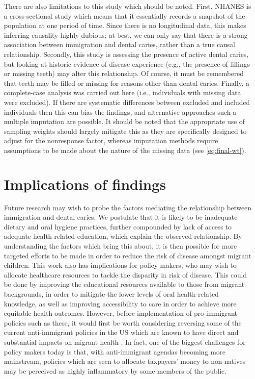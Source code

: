 There are also limitations to this study which should be noted. First, NHANES is a cross-sectional study which means that it essentially records a snapshot of the population at one period of time. Since there is no longitudinal data, this makes inferring causality highly dubious; at best, we can only say that there is a strong association between immigration and dental caries, rather than a true causal relationship. Secondly, this study is assessing the presence of active dental caries, but looking at historic evidence of disease experience (e.g., the presence of fillings or missing teeth) may alter this relationship. Of course, it must be remembered that teeth may be filled or missing for reasons other than dental caries. Finally, a complete-case analysis was carried out here (i.e., individuals with missing data were excluded). If there are systematic differences between excluded and included individuals then this can bias the findings, and alternative approaches such a multiple imputation are possible. It should be noted that the appropriate use of sampling weights should largely mitigate this as they are specifically designed to adjust for the nonresponse factor, whereas imputation methods require assumptions to be made about the nature of the missing data (see \autoref{eq:final-wt}).

\section{Implications of findings}

Future research may wish to probe the factors mediating the relationship between immigration and dental caries. We postulate that it is likely to be inadequate dietary and oral hygiene practices, further compounded by lack of access to adequate health-related education, which explain the observed relationship. By understanding the factors which bring this about, it is then possible for more targeted efforts to be made in order to reduce the risk of disease amongst migrant children. This work also has implications for policy makers, who may wish to allocate healthcare resources to tackle the disparity in risk of disease. This could be done by improving the educational resources available to those from migrant backgrounds, in order to mitigate the lower levels of oral health-related knowledge, as well as improving accessibility to care in order to achieve more equitable health outcomes. However, before implementation of pro-immigrant policies such as these, it would first be worth considering reversing some of the current anti-immigrant policies in the US which are known to have direct and substantial impacts on migrant health \citep{nuño2022}. In fact, one of the biggest challenges for policy makers today is that, with anti-immigrant agendas becoming more mainstream, policies which are seen to allocate taxpayers' money to non-natives may be perceived as highly inflammatory by some members of the public.